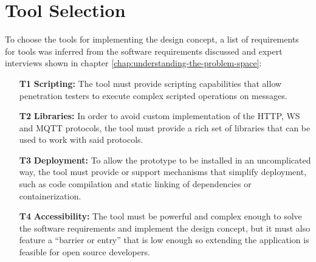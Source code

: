 \section{Tool Selection}
\label{sec:tool-selection}
To choose the tools for implementing the design concept, a list of requirements for tools was inferred from the software requirements discussed and expert interviews shown in chapter \ref{chap:understanding-the-problem-space}:
\begin{itemize}
    \item [\textbf{T1}] \textbf{Scripting:} The tool must provide scripting capabilities that allow penetration testers to execute complex scripted operations on messages.
    \item [\textbf{T2}] \textbf{Libraries:} In order to avoid custom implementation of the \ac{HTTP}, \ac{WS} and \ac{MQTT} protocols, the tool must provide a rich set of libraries that can be used to work with said protocols.
    \item [\textbf{T3}] \textbf{Deployment:} To allow the prototype to be installed in an uncomplicated way, the tool must provide or support mechanisms that simplify deployment, such as code compilation and static linking of dependencies or containerization.
    \item [\textbf{T4}] \textbf{Accessibility:} The tool must be powerful and complex enough to solve the software requirements and implement the design concept, but it must also feature a \enquote{barrier or entry} that is low enough so extending the application is feasible for open source developers.
\end{itemize}

